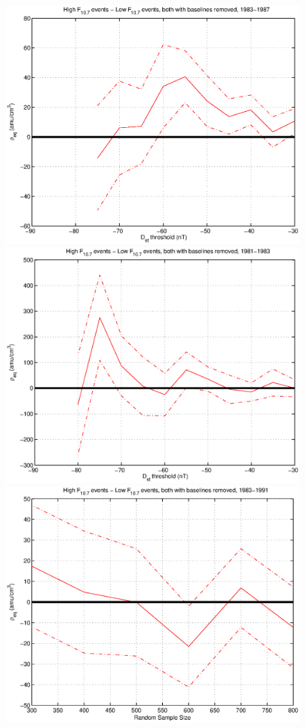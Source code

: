 \documentclass[10pt,twocolumn]{article}
\begin{document}
\begin{figure}[htp!]
\includegraphics[scale=0.45]{paperfigures/DstRhoThresh-1983-1987.eps}
\includegraphics[scale=0.45]{paperfigures/DstRhoThresh-1981-1983.eps}
\includegraphics[scale=0.45]{paperfigures/RandRhoThresh-1983-1991.eps}

\end{figure}
\end{document}
